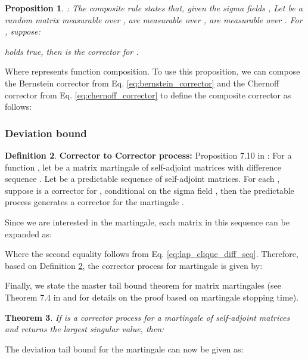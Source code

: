 \documentclass{article}
\theoremstyle{plain}
\newtheorem{theorem}{Theorem}[section]
\newtheorem{proposition}[theorem]{Proposition}
\theoremstyle{definition}
\newtheorem{definition}[theorem]{Definition}
\theoremstyle{remark}
\begin{document}
\begin{proposition}
\label{prop:corrector_composition}
\citep{tropp2019matrix} : The composite rule states that, given the sigma fields , Let  be a random matrix measurable over ,  are measurable over ,  are measurable over . For , suppose:

holds true, then  is the corrector for .
\end{proposition}

Where  represents function composition. To use this proposition, we can compose the Bernstein corrector  from Eq. \ref{eq:bernstein_corrector} and the Chernoff corrector  from Eq. \ref{eq:chernoff_corrector} to define the composite corrector as follows:



\subsubsection{Deviation bound}

\begin{definition}
\label{def:corrector_to_corrector_process}
\textbf{Corrector to Corrector process:} Proposition 7.10 in \citet{tropp2019matrix}: For a function , let  be a matrix martingale of self-adjoint matrices with difference sequence . Let  be a predictable sequence of self-adjoint matrices. For each , suppose  is a corrector for , conditional on the sigma field , then the predictable process  generates a corrector  for the martingale .
\end{definition}

Since we are interested in the  martingale, each matrix in this sequence can be expanded as:

Where the second equality follows from Eq. \ref{eq:lap_clique_diff_seq}. Therefore, based on Definition \ref{def:corrector_to_corrector_process}, the corrector process  for martingale  is given by:


Finally, we state the master tail bound theorem for matrix martingales (see Theorem 7.4 in \citet{tropp2019matrix} and \citet{freedman1975tail} for details on the proof based on martingale stopping time).
\begin{theorem}
\label{thm:matrix_martingale_master_tail_bound}
\citep{tropp2019matrix} If  is a corrector process for a martingale  of self-adjoint matrices and  returns the largest singular value, then:


\end{theorem}

The deviation tail bound for the martingale  can now be given as:
\end{document}
